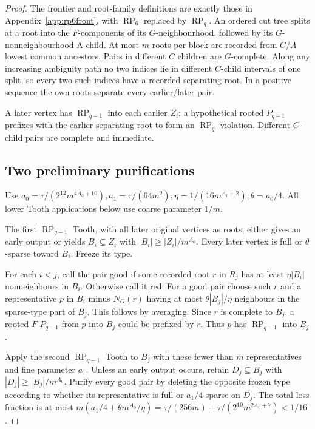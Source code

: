 \documentclass[11pt,a4paper]{article}
\theoremstyle{definition}
\theoremstyle{remark}
\numberwithin{equation}{section}
\DeclareMathOperator{\RP}{RP}
\begin{document}
\begin{proof}
The frontier and root-family definitions are exactly those in Appendix~\ref{app:rp6front}, with \(\operatorname{RP}_{6}\) replaced by \(\RP_{q}\). An ordered cut tree splits at a root into the \(F\)-components of its \(G\)-neighbourhood, followed by its \(G\)-nonneighbourhood A child. At most \(m\) roots per block are recorded from \(C/A\) lowest common ancestors. Pairs in different \(C\) children are \(G\)-complete. Along any increasing ambiguity path no two indices lie in different \(C\)-child intervals of one split, so every two such indices have a recorded separating root. In a positive sequence the own roots separate every earlier/later pair.

A later vertex has \(\RP_{q-1}\) into each earlier \(Z_{i}\): a hypothetical rooted \(P_{q-1}\) prefixes with the earlier separating root to form an \(\RP_{q}\) violation. Different \(C\)-child pairs are complete and immediate.
\subsection{Two preliminary purifications}\label{subsec:rpq-preparatory}
Use \(a_{0}=\tau/(2^{12} m^{4A_{0}+10}),\allowbreak  a_{1}=\tau/(64m^{2}),\allowbreak  \eta=1/(16m^{A_{0}+2}),\allowbreak  \theta=a_{0}/4\). All lower Tooth applications below use coarse parameter \(1/m\).

The first \(\RP_{q-1}\) Tooth, with all later original vertices as roots, either gives an early output or yields \(B_{i}\subseteq Z_{i}\) with \(|B_{i}|\ge |Z_{i}|/m^{A_{0}}\). Every later vertex is full or \(\theta\)-sparse toward \(B_{i}\). Freeze its type.

For each \(i<j\), call the pair good if some recorded root \(r\) in \(R_{j}\) has at least \(\eta|B_{i}|\) nonneighbours in \(B_{i}\). Otherwise call it red. For a good pair choose such \(r\) and a representative \(p\) in \(B_{i}\) minus \(N_{G}(r)\) having at most \(\theta|B_{j}|/\eta\) neighbours in the sparse-type part of \(B_{j}\). This follows by averaging. Since \(r\) is complete to \(B_{j}\), a rooted \(F\text{-}P_{q-1}\) from \(p\) into \(B_{j}\) could be prefixed by \(r\). Thus \(p\) has \(\RP_{q-1}\) into \(B_{j}\).

Apply the second \(\RP_{q-1}\) Tooth to \(B_{j}\) with these fewer than \(m\) representatives and fine parameter \(a_{1}\). Unless an early output occurs, retain \(D_{j}\subseteq B_{j}\) with \(|D_{j}|\ge |B_{j}|/m^{A_{0}}\). Purify every good pair by deleting the opposite frozen type according to whether its representative is full or \(a_{1}/4\)-sparse on \(D_{j}\). The total loss fraction is at most \(m(a_{1}/4 + \theta m^{A_{0}}/\eta) =\tau/(256m) + \tau/(2^{10} m^{2A_{0}+7}) <1/16\).


\end{proof}
\end{document}
